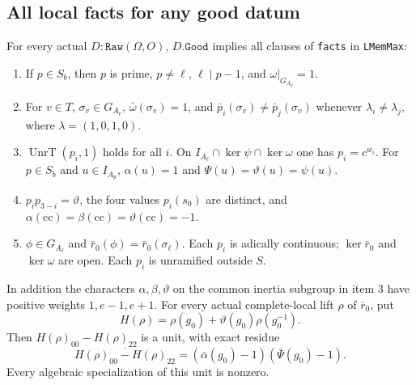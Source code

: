 \subsection{All local facts for any good datum}

\begin{proposition}
\label{prop:ax-facts}
For every actual $D:\mathtt{Raw}(\Omega,O)$, $D.\mathtt{Good}$
implies all clauses of \texttt{facts} in \texttt{LMemMax}:
\begin{enumerate}
\item If $p\in S_b$, then $p$ is prime, $p\ne\ell$,
$\ell\mid p-1$, and $\omega|_{G_{A_p}}=1$.
\item For $v\in T$, $\sigma_v\in G_{A_v}$,
$\bar\omega(\sigma_v)=1$, and
$\bar p_i(\sigma_v)\ne\bar p_j(\sigma_v)$ whenever
$\lambda_i\ne\lambda_j$, where $\lambda=(1,0,1,0)$.
\item $\operatorname{UnrT}(p_i,1)$ holds for all $i$.  On
$I_{A_\ell}\cap\ker\psi\cap\ker\omega$ one has $p_i=c^{w_i}$.
For $p\in S_b$ and $u\in I_{A_p}$,
$\alpha(u)=1$ and $\Psi(u)=\vartheta(u)=\psi(u)$.
\item $p_i p_{3-i}=\vartheta$, the four values $p_i(s_0)$ are
distinct, and $\alpha(\mathrm{cc})=\beta(\mathrm{cc})=
\vartheta(\mathrm{cc})=-1$.
\item $\phi\in G_{A_\ell}$ and
$\bar r_0(\phi)=\bar r_0(\sigma_\ell)$.  Each $p_i$ is adically
continuous; $\ker\bar r_0$ and $\ker\omega$ are open.
Each $p_i$ is unramified outside $S$.
\end{enumerate}
In addition the characters $\alpha,\beta,\vartheta$ on the common
inertia subgroup in item 3 have positive weights $1,e-1,e+1$.
For every actual complete-local lift $\rho$ of $\bar r_0$, put
\[
 H(\rho)=\rho(g_0)+\vartheta(g_0)\rho(g_0^{-1}).
\]
Then $H(\rho)_{00}-H(\rho)_{22}$ is a unit, with exact residue
\[
 \overline{H(\rho)_{00}-H(\rho)_{22}}
       =(\bar\alpha(g_0)-1)(\bar\Psi(g_0)-1).
 \tag{AX.23}
\]
Every algebraic specialization of this unit is nonzero.
\end{proposition}


